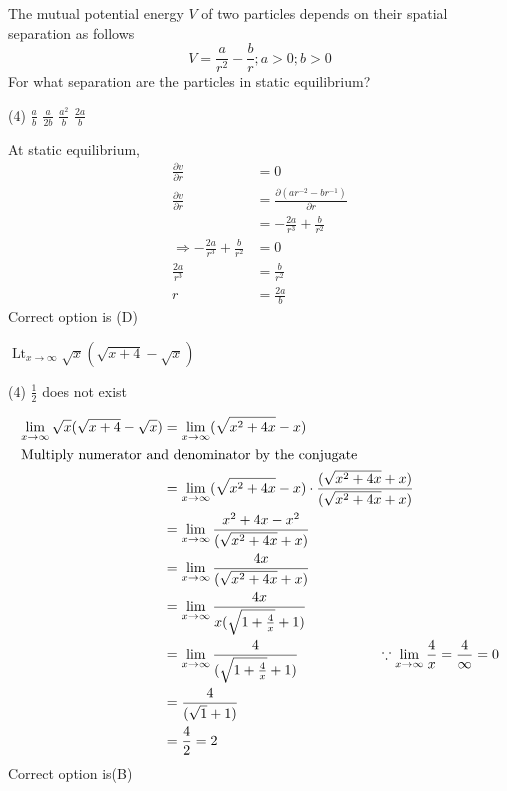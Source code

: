 \begin{questions}
\begin{minipage}{\textwidth}
	\question The mutual potential energy $V$ of two particles depends on their spatial separation as follows $$V=\frac{a}{r^{2}}-\frac{b}{r} ; a>0 ; b>0$$For what separation are the particles in static equilibrium?
\end{minipage}
\begin{tasks}(4)
	\task[\textbf{A.}] $\frac{a}{b}$
	\task[\textbf{B.}]$\frac{a}{2 b}$
	\task[\textbf{C.}] $\frac{a^{2}}{b}$
	\task[\textbf{D.}] $\frac{2 a}{b}$ 
\end{tasks}
\begin{answer}
	At static equilibrium,\begin{align*}
	\frac{\partial v}{\partial r}&=0\\
	\frac{\partial v}{\partial r}&=\frac{\partial( ar^{-2}-br^{-1})}{\partial r }\\
	&=-\frac{2a}{r^{3}}+\frac{b}{r^{2}}\\
	\Rightarrow -\frac{2a}{r^{3}}+\frac{b}{r^{2}}&=0\\
	\frac{2a}{r^{3}}&=\frac{b}{r^{2}}\\
	r&=\frac{2a}{b}
	\end{align*}
	Correct option is (D)
\end{answer}
\begin{minipage}{\textwidth}
	\question $\operatorname{Lt}_{x \rightarrow \infty} \sqrt{x}(\sqrt{x+4}-\sqrt{x})$
\end{minipage}
\begin{tasks}(4)
	\task[\textbf{C.}] $\frac{1}{2}$
	\task[\textbf{D.}] does not exist
\end{tasks}
\begin{answer}
	\begin{align*}
	\lim _{x \rightarrow \infty} \sqrt{x}(\sqrt{x+4}-\sqrt{x})&=\lim _{x \rightarrow \infty} (\sqrt{x^{2}+4x}-{x})\\
	\intertext{Multiply numerator and denominator by the conjugate}
	&=\lim _{x \rightarrow \infty} (\sqrt{x^{2}+4x}-{x})\cdot \frac{(\sqrt{x^{2}+4x}+{x})}{(\sqrt{x^{2}+4x}+{x})}\\
	&=\lim _{x \rightarrow \infty} \frac{x^{2}+4x-x^{2}}{(\sqrt{x^{2}+4x}+{x})}\\
	&=\lim _{x \rightarrow \infty} \frac{4x}{(\sqrt{x^{2}+4x}+{x})}\\
	&=\lim _{x \rightarrow \infty} \frac{4x}{x(\sqrt{1+\frac{4}{x}}+{1})}\\
	&=\lim _{x \rightarrow \infty} \frac{4}{(\sqrt{1+\frac{4}{x}}+{1})} \hspace{2cm} \because \lim _{x \rightarrow \infty}\frac{4}{x}=\frac{4}{\infty}=0 \\
	&=\frac{4}{(\sqrt{1}+{1})}\\
	&=\frac{4}{2}=2
	\end{align*}
	Correct option is(B)
\end{answer}


\end{questions}
